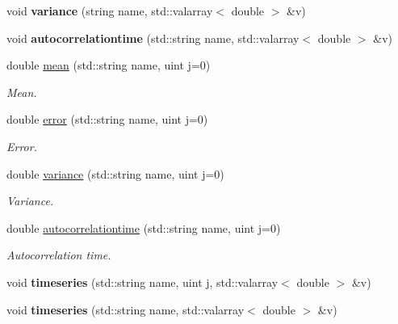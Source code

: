 \begin{CompactItemize}
\item 
\hypertarget{classmeasurements_414a25ea84f3411f5be8b79c420faf24}{
void \textbf{variance} (string name, std::valarray$<$ double $>$ \&v)}
\label{classmeasurements_414a25ea84f3411f5be8b79c420faf24}

\item 
\hypertarget{classmeasurements_b7dc9fa106c715e25be80f34691d9cb2}{
void \textbf{autocorrelationtime} (std::string name, std::valarray$<$ double $>$ \&v)}
\label{classmeasurements_b7dc9fa106c715e25be80f34691d9cb2}

\item 
double \hyperlink{classmeasurements_31f97f8609ffa441bddf91214f8b00d6}{mean} (std::string name, uint j=0)
\begin{CompactList}\small\item\em Mean. \item\end{CompactList}\item 
double \hyperlink{classmeasurements_1d661d53942575a15cbe1da08c11c643}{error} (std::string name, uint j=0)
\begin{CompactList}\small\item\em Error. \item\end{CompactList}\item 
double \hyperlink{classmeasurements_264dc7ff4d785f16bdb5acbfea94d96c}{variance} (std::string name, uint j=0)
\begin{CompactList}\small\item\em Variance. \item\end{CompactList}\item 
double \hyperlink{classmeasurements_a9a1fcf0fa8d064af612ac370aae422f}{autocorrelationtime} (std::string name, uint j=0)
\begin{CompactList}\small\item\em Autocorrelation time. \item\end{CompactList}\item 
\hypertarget{classmeasurements_e72f7e3f3f44ba3cf8a1420b603c2ea4}{
void \textbf{timeseries} (std::string name, uint j, std::valarray$<$ double $>$ \&v)}
\label{classmeasurements_e72f7e3f3f44ba3cf8a1420b603c2ea4}

\item 
\hypertarget{classmeasurements_006331fafb7a25d8744cb50954555029}{
void \textbf{timeseries} (std::string name, std::valarray$<$ double $>$ \&v)}
\label{classmeasurements_006331fafb7a25d8744cb50954555029}


\end{CompactItemize}
